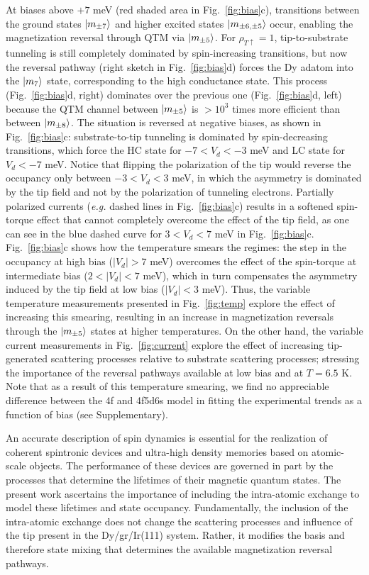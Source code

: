 \documentclass[
reprint,amsmath,amssymb,aps]{revtex4-2}
\begin{document}
At biases above $+7$ meV (red shaded area in Fig.~\ref{fig:bias}c), transitions between the ground states $\ket{m_{\pm7}}$ and higher excited states $\ket{m_{\pm 6, \pm 5}}$ occur, enabling the magnetization reversal through QTM via $\ket{m_{\pm 5}}$. For $\rho_{T \uparrow} = 1 $, tip-to-substrate tunneling is still completely dominated by spin-increasing transitions, but now the reversal pathway (right sketch in Fig.~\ref{fig:bias}d) forces the Dy adatom into the $\ket{m_{7}}$ state, corresponding to the high conductance state. This process (Fig.~\ref{fig:bias}d, right) dominates over the previous one (Fig.~\ref{fig:bias}d, left) because the QTM channel between $\ket{m_{\pm 5}}$ is $>10^3$ times more efficient than between $\ket{m_{\pm 8}}$. 
The situation is reversed at negative biases, as shown in Fig.~\ref{fig:bias}c: substrate-to-tip tunneling is dominated by spin-decreasing transitions, which force the HC state for $-7<V_d<-3$ meV and LC state for $V_d<-7$ meV. Notice that flipping the polarization of the tip would reverse the occupancy only between $-3<V_d<3$ meV, in which the asymmetry is dominated by the tip field and not by the polarization of tunneling electrons. Partially polarized currents (\textit{e.g.} dashed lines in Fig.~\ref{fig:bias}c) results in a softened spin-torque effect that cannot completely overcome the effect of the tip field, as one can see in the blue dashed curve for $3<V_d<7$ meV in Fig.~\ref{fig:bias}c.  Fig.~\ref{fig:bias}c shows how the temperature smears the regimes: the step in the occupancy at high bias ($|V_d|>7$ meV) overcomes the effect of the spin-torque at intermediate bias ($2<|V_d|<7$ meV), which in turn compensates the asymmetry induced by the tip field at low bias ($|V_d|<3$ meV). Thus, the variable temperature measurements presented in Fig.~\ref{fig:temp} explore the effect of increasing this smearing, resulting in an increase in magnetization reversals through the $\ket{m_{\pm 5}}$ states at higher temperatures. On the other hand, the variable current measurements in Fig.~\ref{fig:current} explore the effect of increasing tip-generated scattering processes relative to substrate scattering processes; stressing the importance of the reversal pathways available at low bias and at $T=6.5$ K. Note that as a result of this temperature smearing, we find no appreciable difference between the 4f and 4f5d6s model in fitting the experimental trends as a function of bias (see Supplementary).

An accurate description of spin dynamics is essential for the realization of coherent spintronic devices and ultra-high density memories based on atomic-scale objects. The performance of these devices are governed in part by the processes that determine the lifetimes of their magnetic quantum states. The present work ascertains the importance of including the intra-atomic exchange to model these lifetimes and state occupancy. Fundamentally, the inclusion of the intra-atomic exchange does not change the scattering processes and influence of the tip present in the Dy/gr/Ir(111) system. Rather, it modifies the basis and therefore state mixing that determines the available magnetization reversal pathways.



\end{document}
